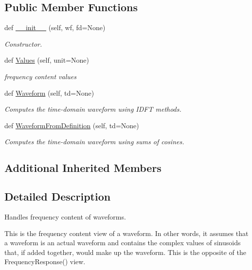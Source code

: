 \subsection*{Public Member Functions}
\begin{DoxyCompactItemize}
\item 
def \hyperlink{classSignalIntegrity_1_1FrequencyDomain_1_1FrequencyContent_1_1FrequencyContent_a6206b0356859e0b87ba95eefb298c2bf}{\+\_\+\+\_\+init\+\_\+\+\_\+} (self, wf, fd=None)
\begin{DoxyCompactList}\small\item\em Constructor. \end{DoxyCompactList}\item 
def \hyperlink{classSignalIntegrity_1_1FrequencyDomain_1_1FrequencyContent_1_1FrequencyContent_a3dc7b1e5eba8fb649156094dfdf7a893}{Values} (self, unit=None)
\begin{DoxyCompactList}\small\item\em frequency content values \end{DoxyCompactList}\item 
def \hyperlink{classSignalIntegrity_1_1FrequencyDomain_1_1FrequencyContent_1_1FrequencyContent_af833a7687c414346de1e2ffab6b47d5c}{Waveform} (self, td=None)
\begin{DoxyCompactList}\small\item\em Computes the time-\/domain waveform using I\+D\+FT methods. \end{DoxyCompactList}\item 
def \hyperlink{classSignalIntegrity_1_1FrequencyDomain_1_1FrequencyContent_1_1FrequencyContent_a8dfcef6517e6699a8b78a2bf9c796230}{Waveform\+From\+Definition} (self, td=None)
\begin{DoxyCompactList}\small\item\em Computes the time-\/domain waveform using sums of cosines. \end{DoxyCompactList}\end{DoxyCompactItemize}
\subsection*{Additional Inherited Members}


\subsection{Detailed Description}
Handles frequency content of waveforms. 

This is the frequency content view of a waveform. In other words, it assumes that a waveform is an actual waveform and contains the complex values of sinusoids that, if added together, would make up the waveform. This is the opposite of the Frequency\+Response() view.

